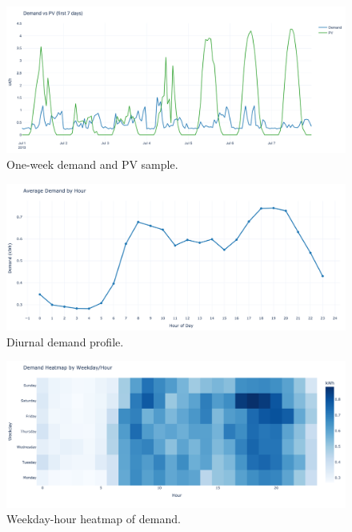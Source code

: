 \documentclass[12pt,a4paper]{article}
\begin{document}
\begin{figure}[H]
  \centering
  \includegraphics[width=\linewidth]{01_demand_pv_daily_sample.png}
  \caption{One-week demand and PV sample.}
  \label{fig:timeseries_week}
\end{figure}

\begin{figure}[H]
  \centering
  \includegraphics[width=\linewidth]{02_demand_diurnal_profile.png}
  \caption{Diurnal demand profile.}
  \label{fig:diurnal}
\end{figure}

\begin{figure}[H]
  \centering
  \includegraphics[width=\linewidth]{02_demand_weekday_heatmap.png}
  \caption{Weekday-hour heatmap of demand.}
  \label{fig:weekday_heatmap}
\end{figure}
\end{document}
